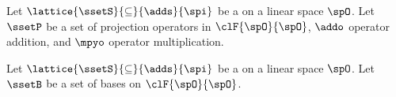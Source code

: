 
\begin{theorem}
\label{thm:operator_lattice}
Let $\lattice{\ssetS}{\subseteq}{\adds}{\spi }$ be a 
on a linear space $\spO$.
Let $\ssetP$ be a set of projection operators in $\clF{\spO}{\spO}$,
$\addo$ operator addition, and $\mpyo$ operator multiplication.
\end{theorem}

\begin{theorem}
\label{thm:basis_lattice}
Let $\lattice{\ssetS}{\subseteq}{\adds}{\spi }$ be a 
on a linear space $\spO$.
Let $\ssetB$ be a set of bases on $\clF{\spO}{\spO}$.
\end{theorem}

